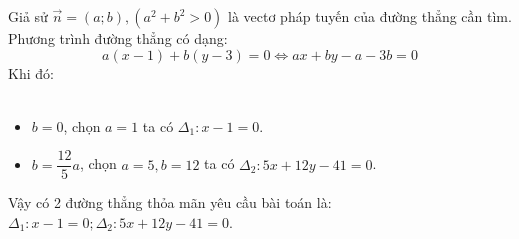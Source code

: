 \lgi
Giả sử $\vec{n}=(a;b), (a^2+b^2>0)$ là vectơ pháp tuyến của đường thẳng cần tìm. Phương trình đường thẳng có dạng:
$$a(x-1)+b(y-3)=0 \Leftrightarrow ax + by -a-3b=0$$
Khi đó:\\
\cl{$
d_{(B;\Delta)}=3 \Leftrightarrow  \dfrac{|-2a+b-a-3b|}{\sqrt{a^2+b^2}}=3  \Leftrightarrow  5a^2 -12ab=0 \Leftrightarrow  \left[ \begin{array}{l}b=0 \\ b=\dfrac{12}{5}a \end{array} \right.$}\\
\begin{itemize}
\item $b=0$, chọn $a=1$ ta có $\Delta_1: x-1=0$.
\item $b=\dfrac{12}{5}a$, chọn $a=5,b=12$ ta có $\Delta_2: 5x+12y-41=0$.
\end{itemize}
Vậy có 2 đường thẳng thỏa mãn yêu cầu bài toán là: $\Delta_1 : x-1=0; \Delta_2 : 5x+12y-41=0
$.

